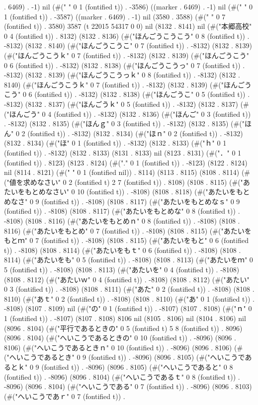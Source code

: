 . 6469) . -1) nil (#(" " 0 1 (fontified t)) . -3586) ((marker . 6469) . -1) nil (#(" " 0 1 (fontified t)) . -3587) ((marker . 6469) . -1) nil (3580 . 3588) (#("       " 0 7 (fontified t)) . 3580) 3587 (t 22015 54317 0 0) nil (8132 . 8141) nil (#("本郷高校" 0 4 (fontified t)) . 8132) (8132 . 8136) (#("ほんごうこうこう" 0 8 (fontified t)) . -8132) (8132 . 8140) (#("ほんごうこうこ" 0 7 (fontified t)) . -8132) (8132 . 8139) (#("ほんごうこうｋ" 0 7 (fontified t)) . -8132) (8132 . 8139) (#("ほんごうこう" 0 6 (fontified t)) . -8132) (8132 . 8138) (#("ほんごうこうっ" 0 7 (fontified t)) . -8132) (8132 . 8139) (#("ほんごうこうっｋ" 0 8 (fontified t)) . -8132) (8132 . 8140) (#("ほんごうこうｋ" 0 7 (fontified t)) . -8132) (8132 . 8139) (#("ほんごうこう" 0 6 (fontified t)) . -8132) (8132 . 8138) (#("ほんごうこ" 0 5 (fontified t)) . -8132) (8132 . 8137) (#("ほんごうｋ" 0 5 (fontified t)) . -8132) (8132 . 8137) (#("ほんごう" 0 4 (fontified t)) . -8132) (8132 . 8136) (#("ほんご" 0 3 (fontified t)) . -8132) (8132 . 8135) (#("ほんｇ" 0 3 (fontified t)) . -8132) (8132 . 8135) (#("ほん" 0 2 (fontified t)) . -8132) (8132 . 8134) (#("ほｎ" 0 2 (fontified t)) . -8132) (8132 . 8134) (#("ほ" 0 1 (fontified t)) . -8132) (8132 . 8133) (#("ｈ" 0 1 (fontified t)) . -8132) (8132 . 8133) (8131 . 8133) nil (8123 . 8131) (#("．" 0 1 (fontified t)) . 8123) (8123 . 8124) (#("." 0 1 (fontified t)) . -8123) (8122 . 8124) nil (8114 . 8121) (#(" " 0 1 (fontified nil)) . 8114) (8113 . 8115) (8108 . 8114) (#("値を求めなさい" 0 2 (fontified t) 2 7 (fontified t)) . 8108) (8108 . 8115) (#("あたいをもとめなさい" 0 10 (fontified t)) . -8108) (8108 . 8118) (#("あたいをもとめなさ" 0 9 (fontified t)) . -8108) (8108 . 8117) (#("あたいをもとめなｓ" 0 9 (fontified t)) . -8108) (8108 . 8117) (#("あたいをもとめな" 0 8 (fontified t)) . -8108) (8108 . 8116) (#("あたいをもとめｎ" 0 8 (fontified t)) . -8108) (8108 . 8116) (#("あたいをもとめ" 0 7 (fontified t)) . -8108) (8108 . 8115) (#("あたいをもとｍ" 0 7 (fontified t)) . -8108) (8108 . 8115) (#("あたいをもと" 0 6 (fontified t)) . -8108) (8108 . 8114) (#("あたいをもｔ" 0 6 (fontified t)) . -8108) (8108 . 8114) (#("あたいをも" 0 5 (fontified t)) . -8108) (8108 . 8113) (#("あたいをｍ" 0 5 (fontified t)) . -8108) (8108 . 8113) (#("あたいを" 0 4 (fontified t)) . -8108) (8108 . 8112) (#("あたいｗ" 0 4 (fontified t)) . -8108) (8108 . 8112) (#("あたい" 0 3 (fontified t)) . -8108) (8108 . 8111) (#("あた" 0 2 (fontified t)) . -8108) (8108 . 8110) (#("あｔ" 0 2 (fontified t)) . -8108) (8108 . 8110) (#("あ" 0 1 (fontified t)) . -8108) (8107 . 8109) nil (#("の" 0 1 (fontified t)) . -8107) (8107 . 8108) (#("ｎ" 0 1 (fontified t)) . -8107) (8107 . 8108) 8106 nil (8105 . 8106) nil (8104 . 8106) nil (8096 . 8104) (#("平行であるときの" 0 5 (fontified t) 5 8 (fontified t)) . 8096) (8096 . 8104) (#("へいこうであるときの" 0 10 (fontified t)) . -8096) (8096 . 8106) (#("へいこうであるときｎ" 0 10 (fontified t)) . -8096) (8096 . 8106) (#("へいこうであるとき" 0 9 (fontified t)) . -8096) (8096 . 8105) (#("へいこうであるとｋ" 0 9 (fontified t)) . -8096) (8096 . 8105) (#("へいこうであると" 0 8 (fontified t)) . -8096) (8096 . 8104) (#("へいこうであるｔ" 0 8 (fontified t)) . -8096) (8096 . 8104) (#("へいこうである" 0 7 (fontified t)) . -8096) (8096 . 8103) (#("へいこうであｒ" 0 7 (fontified t)) . 